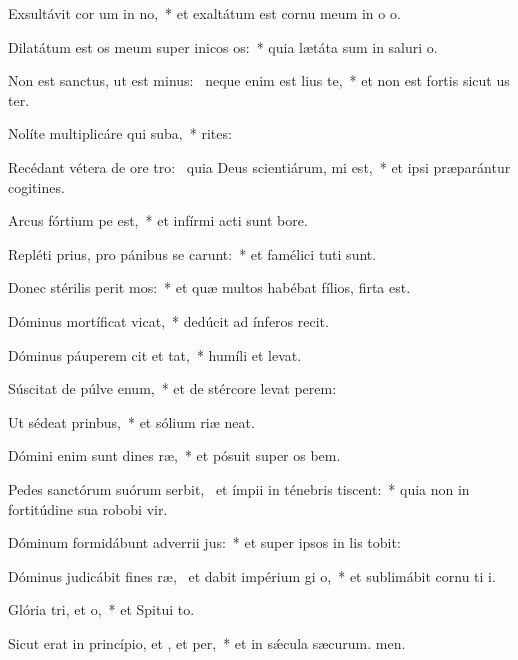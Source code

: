 \item Exsultávit cor um in no,~* et exaltátum est cornu meum in o o.
\item Dilatátum est os meum super inicos os:~* quia lætáta sum in saluri o.
\item Non est sanctus, ut est minus:~\pscross{} neque enim est lius  te,~* et non est fortis sicut us ter.
\item Nolíte multiplicáre qui suba,~* rites:
\item Recédant vétera de ore tro:~\pscross{} quia Deus scientiárum, mi est,~* et ipsi præparántur cogitines.
\item Arcus fórtium pe est,~* et infírmi acti sunt bore.
\item Repléti prius, pro pánibus se carunt:~* et famélici tuti sunt.
\item Donec stérilis perit mos:~* et quæ multos habébat fílios, firta est.
\item Dóminus mortíficat  vicat,~* dedúcit ad ínferos  recit.
\item Dóminus páuperem cit et tat,~* humíli et levat.
\item Súscitat de púlve enum,~* et de stércore levat perem:
\item Ut sédeat  prinbus,~* et sólium riæ neat.
\item Dómini enim sunt dines ræ,~* et pósuit super os bem.
\item Pedes sanctórum suórum serbit,~\pscross{} et ímpii in ténebris tiscent:~* quia non in fortitúdine sua robobi vir.
\item Dóminum formidábunt adverrii jus:~* et super ipsos in lis tobit:
\item Dóminus judicábit fines ræ,~\pscross{} et dabit impérium gi o,~* et sublimábit cornu ti i.
\item Glória tri, et o,~* et Spitui to.
\item Sicut erat in princípio, et , et per,~* et in sǽcula sæcurum. men.
